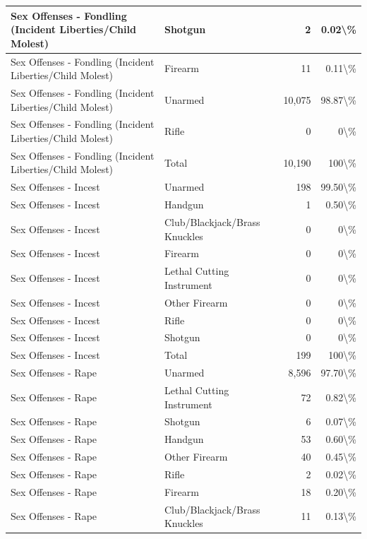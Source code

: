 \documentclass[
]{krantz}
\begin{document}
\begin{longtable}[t]{l|l|r|r}
\hline
Sex Offenses - Fondling (Incident Liberties/Child Molest) & Shotgun & 2 & 0.02\textbackslash{}\%\\
\hline
Sex Offenses - Fondling (Incident Liberties/Child Molest) & Firearm & 11 & 0.11\textbackslash{}\%\\
\hline
Sex Offenses - Fondling (Incident Liberties/Child Molest) & Unarmed & 10,075 & 98.87\textbackslash{}\%\\
\hline
Sex Offenses - Fondling (Incident Liberties/Child Molest) & Rifle & 0 & 0\textbackslash{}\%\\
\hline
Sex Offenses - Fondling (Incident Liberties/Child Molest) & Total & 10,190 & 100\textbackslash{}\%\\
\hline
Sex Offenses - Incest & Unarmed & 198 & 99.50\textbackslash{}\%\\
\hline
Sex Offenses - Incest & Handgun & 1 & 0.50\textbackslash{}\%\\
\hline
Sex Offenses - Incest & Club/Blackjack/Brass Knuckles & 0 & 0\textbackslash{}\%\\
\hline
Sex Offenses - Incest & Firearm & 0 & 0\textbackslash{}\%\\
\hline
Sex Offenses - Incest & Lethal Cutting Instrument & 0 & 0\textbackslash{}\%\\
\hline
Sex Offenses - Incest & Other Firearm & 0 & 0\textbackslash{}\%\\
\hline
Sex Offenses - Incest & Rifle & 0 & 0\textbackslash{}\%\\
\hline
Sex Offenses - Incest & Shotgun & 0 & 0\textbackslash{}\%\\
\hline
Sex Offenses - Incest & Total & 199 & 100\textbackslash{}\%\\
\hline
Sex Offenses - Rape & Unarmed & 8,596 & 97.70\textbackslash{}\%\\
\hline
Sex Offenses - Rape & Lethal Cutting Instrument & 72 & 0.82\textbackslash{}\%\\
\hline
Sex Offenses - Rape & Shotgun & 6 & 0.07\textbackslash{}\%\\
\hline
Sex Offenses - Rape & Handgun & 53 & 0.60\textbackslash{}\%\\
\hline
Sex Offenses - Rape & Other Firearm & 40 & 0.45\textbackslash{}\%\\
\hline
Sex Offenses - Rape & Rifle & 2 & 0.02\textbackslash{}\%\\
\hline
Sex Offenses - Rape & Firearm & 18 & 0.20\textbackslash{}\%\\
\hline
Sex Offenses - Rape & Club/Blackjack/Brass Knuckles & 11 & 0.13\textbackslash{}\%\\

\end{longtable}
\end{document}
